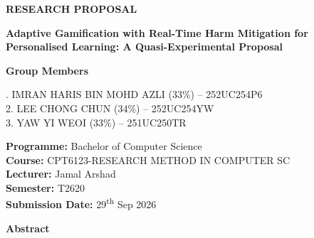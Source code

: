 \documentclass[12pt,a4paper]{article}
\begin{document}
\begin{center}

{\fontsize{18}{22}\selectfont\textbf{RESEARCH PROPOSAL}}

\vspace{0.5cm}

{\fontsize{18}{22}\selectfont\textbf{Adaptive Gamification with Real-Time Harm Mitigation for Personalised Learning: A Quasi-Experimental Proposal}}

\vspace{1cm}

{\fontsize{12}{14}\selectfont\textbf{Group Members}}

\vspace{0.3cm}

{\fontsize{12}{14}. IMRAN HARIS BIN MOHD AZLI (33\%) -- 252UC254P6\\
2. LEE CHONG CHUN (34\%) -- 252UC254YW\\
3. YAW YI WEOI (33\%) -- 251UC250TR
}

\vspace{0.8cm}

{\fontsize{12}{14}\selectfont
\textbf{Programme:} Bachelor of Computer Science\\
\textbf{Course:} CPT6123-RESEARCH METHOD IN COMPUTER SC\\
\textbf{Lecturer:} Jamal Arshad\\
\textbf{Semester:} T2620\\
\textbf{Submission Date:} 29\textsuperscript{th} Sep 2026
}

\end{center}



\vspace{0.5cm}

\noindent
\textbf{Abstract}

\vspace{0.2cm}
\end{document}
